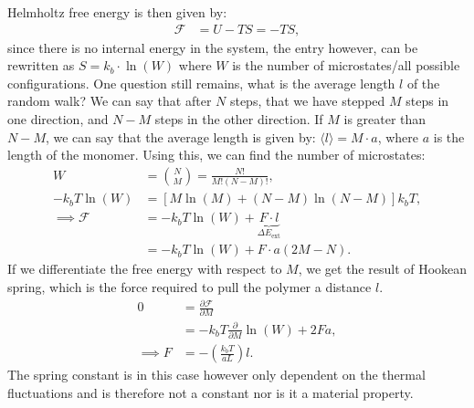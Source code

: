 \documentclass[a4paper]{article}
\newcommand{\f}{\mathcal{F}}
\begin{document}
\vspace*{0.5cm}\noindent
Helmholtz free energy is then given by:
\begin{align*}
    \f &= U - TS = -TS,
\end{align*}since there is no internal energy in the system, the entry however, can be rewritten as $S = k_b\cdot \ln(W)$ where $W$ is the number of microstates/all possible configurations.
One question still remains, what is the average length $l$ of the random walk? We can say that after $N$ steps, that we have stepped $M$ steps in one direction, and $N-M$ steps in the other direction.
If $M$ is greater than $N-M$, we can say that the average length is given by: $\langle l\rangle = M\cdot a$, where $a$ is the length of the monomer. Using this, we can find the number of microstates:
\begin{align*}
    W &= \binom{N}{M} = \frac{N!}{M!(N-M)!},\\
    -k_bT\ln(W) &= \left[M\ln(M) + (N-M)\ln(N-M)\right]k_bT,\\
    \implies \f &= -k_bT\ln(W) + \underbrace{F\cdot l}_{\Delta E_{\text{ext}}}\\
    &=-k_bT\ln(W) + F\cdot a(2M-N).
\end{align*}If we differentiate the free energy with respect to $M$, we get the result of Hookean spring, which is the force required to pull the polymer a distance $l$.
\begin{align*}
    0&= \frac{\partial \f}{\partial M}\\
    &= -k_bT\frac{\partial}{\partial M}\ln(W) + 2Fa,\\
    \implies F&= -\left(\frac{k_bT}{aL}\right)l.
\end{align*}The spring constant is in this case however only dependent on the thermal fluctuations and is therefore not a constant nor is it a material property.
\end{document}
